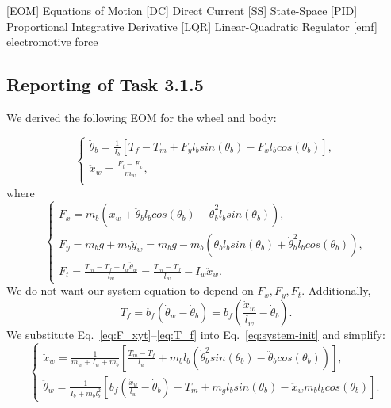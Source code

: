 \documentclass[11pt]{article} %
\begin{document}
\begin{acronym}[TDMA]
		[EOM]	{Equations of Motion}
		[DC]	{Direct Current}
		[SS]	{State-Space}
		[PID]	{Proportional Integrative Derivative}
		[LQR]	{Linear-Quadratic Regulator}
		[emf]	{electromotive force}
\end{acronym}

\subsection*{Reporting of Task 3.1.5}
We derived the following \ac{EOM} for the wheel and body:

\begin{equation}\label{eq:system-init}
  \begin{cases}
    \ddot{\theta}_b =
    \frac{1}{I_b}\left[
      T_f
      - T_m
      + F_y l_b sin(\theta_b)
      - F_x l_b cos(\theta_b)
    \right], \\[1em]
    \ddot{x}_w = \frac{F_t - F_x}{m_w}, \\
  \end{cases}
\end{equation}
where
\begin{equation}\label{eq:F_xyt}
  \begin{cases}
    F_x = m_b\left(
      \ddot{x}_w
      + \ddot{\theta}_b l_b cos(\theta_b)
      - \dot{\theta}^2_b l_b sin(\theta_b)
    \right), \\[1em]
    F_y = m_b g+ m_b \ddot{y}_w = m_b g - m_b\left(
      \ddot{\theta}_b l_b sin(\theta_b)
      + \dot{\theta}^2_b l_b cos(\theta_b)
    \right), \\[1em]
    F_t = \frac{T_m - T_f - I_w \ddot{\theta}_w}{l_w} = \frac{T_m - T_f}{l_w} - I_w \ddot{x}_w.
  \end{cases}
\end{equation}
We do not want our system equation to depend on $F_x, F_y, F_t$.
Additionally,
\begin{equation}\label{eq:T_f}
T_f = b_f\left(
\dot{\theta}_w - \dot{\theta}_b
\right) =
b_f\left(
\frac{\dot{x}_w}{l_w} - \dot{\theta}_b
\right).
\end{equation}
We substitute Eq.~\eqref{eq:F_xyt}--\eqref{eq:T_f} into Eq.~\eqref{eq:system-init} and simplify:
\begin{equation}\label{eq:system}
  \begin{cases}
    \ddot{x}_w = \frac{1}{m_w + I_w + m_b}\left[
      \frac{T_m - T_f}{l_w}
      + m_b l_b \left(\dot{\theta}^2_b sin(\theta_b)
        - \ddot{\theta}_b cos(\theta_b)
      \right)
    \right], \\[1em]
    \ddot{\theta}_w = \frac{1}{I_b + m_b l_b^2}\left[
      b_f\left(\frac{\dot{x}_w}{l_w}
        - \dot{\theta}_b\right)
      - T_m
      + m_g l_b sin(\theta_b)
      - \ddot{x}_w m_b l_b cos(\theta_b)
    \right].
  \end{cases}
\end{equation}
\end{document}
